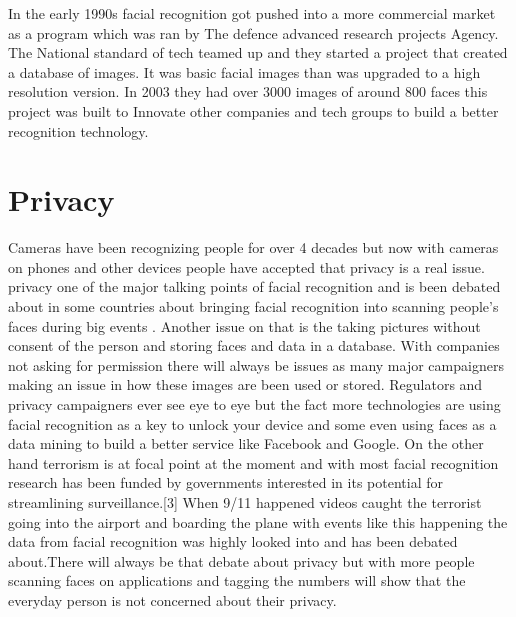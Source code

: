 \documentclass[report]{IEEEtran}
\begin{document}
In the early 1990s facial recognition got pushed into a more commercial market as a program which was ran by The defence advanced research projects Agency. The National standard of tech teamed up and they started a project that created a database of images. It was basic facial images than was upgraded to a high resolution version. In 2003 they had over 3000 images of around 800 faces this project was built to Innovate other companies and tech groups to build a better recognition technology.


\section{Privacy }
Cameras have been recognizing people for over 4 decades but now with cameras on phones and other devices people have accepted that privacy is a real issue.  privacy one of the major talking points of facial recognition and is been debated about in some countries about bringing facial recognition into scanning people's faces during big events . Another issue on that is the taking pictures without consent of the person and storing faces and data in a database. With companies not asking for permission there will always be issues as many major campaigners making an issue in how these images are been used or stored. Regulators and privacy campaigners ever see eye to eye but the fact more technologies are using facial recognition as a key to unlock your device and some even using faces as a data mining to build a better service like Facebook and Google. On the other hand terrorism is at focal point at the moment and with most facial recognition research has been funded by governments interested in its potential for streamlining surveillance.[3]  When 9/11 happened videos caught the terrorist going into the airport and boarding the plane with events like this happening the data from facial recognition  was highly looked into and has been debated about.There will always be that debate about privacy but with more people scanning faces on applications and tagging the numbers will show that the everyday person is not concerned about their privacy.
\end{document}
